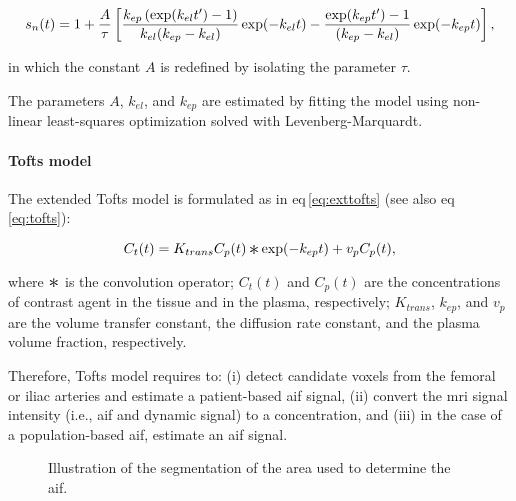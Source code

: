 \begin{equation}
  \small
  s_n(t) = 1 + \frac{A}{\tau} \left[ \frac{k_{ep} \left( \exp(k_{el} t') - 1 \right)}{k_{el}(k_{ep} - k_{el})} \exp(- k_{el} t) - \frac{\exp(k_{ep} t') - 1}{(k_{ep} - k_{el})} \exp(- k_{ep} t) \right] ,
  \label{eq:hoffmann}
\end{equation}

\noindent in which the constant $A$ is redefined by isolating the parameter $\tau$.

The parameters $A$, $k_{el}$, and $k_{ep}$ are estimated by fitting the model using non-linear least-squares optimization solved with Levenberg-Marquardt.

\paragraph{Tofts model}\label{par:chp5:DCE-norm:tofts}

The extended Tofts model is formulated as in \acs{eq}\,\eqref{eq:exttofts} (see also \acs{eq}\,\eqref{eq:tofts}):

\begin{equation}
  C_t(t) = K_{trans} C_p(t) \Conv \exp(-k_{ep}t) + v_p C_p(t),
  \label{eq:exttofts}
\end{equation}

\noindent where $\Conv$ is the convolution operator; $C_t(t)$ and $C_p(t)$ are the concentrations of contrast agent in the tissue and in the plasma, respectively; $K_{trans}$, $k_{ep}$, and $v_p$ are the volume transfer constant, the diffusion rate constant, and the plasma volume fraction, respectively.

Therefore, Tofts model requires to:
(i) detect candidate voxels from the femoral or iliac arteries and estimate a patient-based \ac{aif} signal,
(ii) convert the \ac{mri} signal intensity (i.e., \ac{aif} and dynamic signal) to a concentration, and
(iii) in the case of a population-based \ac{aif}, estimate an \ac{aif} signal.

\begin{figure}
  \centering
  \hspace*{\fill}
   \hfill
   \hfill
  \hspace*{\fill}
  \caption{Illustration of the segmentation of the area used to determine the \acs*{aif}.}
  \label{fig:aif}
\end{figure}

